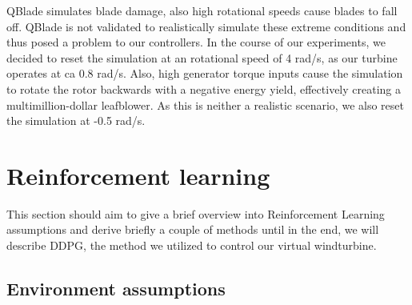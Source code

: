 \documentclass[hyperref,german,beleg]{cgvpub}
\begin{document}
QBlade simulates blade damage, also high rotational speeds cause blades to fall off. QBlade is not validated to realistically simulate these extreme conditions and thus posed a problem to our controllers. In the course of our experiments, we decided to reset the simulation at an rotational speed of 4 rad/s, as our turbine operates at ca 0.8 rad/s. Also, high generator torque inputs cause the simulation to rotate the rotor backwards with a negative energy yield, effectively creating a multimillion-dollar leafblower. As this is neither a realistic scenario, we also reset the simulation at -0.5 rad/s. 

\section{Reinforcement learning}

This section should aim to give a brief overview into Reinforcement Learning assumptions and derive briefly a couple of methods until in the end, we will describe \ac{DDPG}, the method we utilized to control our virtual windturbine.

\subsection{Environment assumptions}
\end{document}
